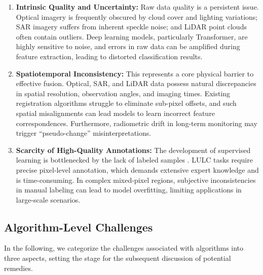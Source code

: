 \documentclass[]{interact}
\theoremstyle{plain}%
\theoremstyle{definition}
\theoremstyle{remark}
\begin{document}
\begin{enumerate}
	\item \textbf{Intrinsic Quality and Uncertainty:} Raw data quality is a persistent issue. Optical imagery is frequently obscured by cloud cover and lighting variations; SAR imagery suffers from inherent speckle noise; and LiDAR point clouds often contain outliers. Deep learning models, particularly Transformer, are highly sensitive to noise, and errors in raw data can be amplified during feature extraction, leading to distorted classification results.
	\item \textbf{Spatiotemporal Inconsistency:} This represents a core physical barrier to effective fusion. Optical, SAR, and LiDAR data possess natural discrepancies in spatial resolution, observation angles, and imaging times. Existing registration algorithms struggle to eliminate sub-pixel offsets, and such spatial misalignments can lead models to learn incorrect feature correspondences. Furthermore, radiometric drift in long-term monitoring may trigger ``pseudo-change'' misinterpretations.
	\item \textbf{Scarcity of High-Quality Annotations:} The development of supervised learning is bottlenecked by the lack of labeled samples \citep{56}. LULC tasks require precise pixel-level annotation, which demands extensive expert knowledge and is time-consuming. In complex mixed-pixel regions, subjective inconsistencies in manual labeling can lead to model overfitting, limiting applications in large-scale scenarios.
\end{enumerate}





\subsection{Algorithm-Level Challenges}

In the following, we categorize the challenges associated with algorithms into three aspects, setting the stage for the subsequent discussion of potential remedies.
\end{document}
